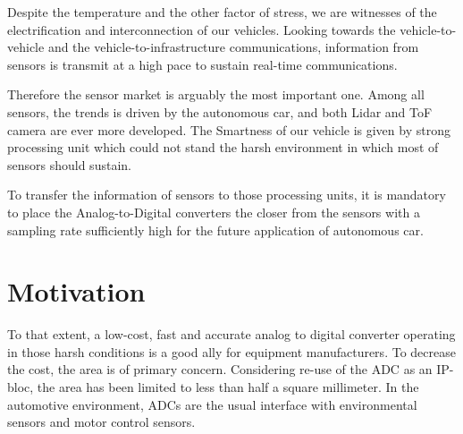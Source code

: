 Despite the temperature and the other factor of stress, we are witnesses of the electrification and interconnection of our vehicles. Looking towards the vehicle-to-vehicle and the vehicle-to-infrastructure communications, information from sensors is transmit at a high pace to sustain real-time communications.

Therefore the sensor market is arguably the most important one. Among all sensors, the trends is driven by the autonomous car, and both Lidar and ToF camera are ever more developed. The Smartness of our vehicle is given by strong processing unit which could not stand the harsh environment in which most of sensors should sustain.

To transfer the information of sensors to those processing units, it is mandatory to place the Analog-to-Digital converters the closer from the sensors with a sampling rate sufficiently high for the future application of autonomous car.

\section{Motivation}   %
To that extent, a low-cost, fast and accurate analog to digital converter operating in those harsh conditions is a good ally for equipment manufacturers. To decrease the cost, the area is of primary concern. Considering re-use of the ADC as an IP-bloc, the area has been limited to less than half a square millimeter.
In the automotive environment, ADCs are the usual interface with environmental sensors and motor control sensors. 

